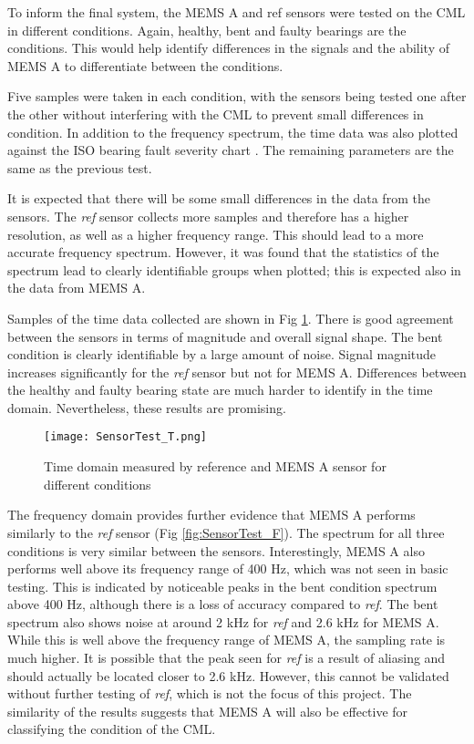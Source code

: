 To inform the final system, the MEMS A and ref sensors were tested on the CML in different conditions.
Again, healthy, bent and faulty bearings are the conditions.
This would help identify differences in the signals and the ability of MEMS A to differentiate between the conditions.
\par

Five samples were taken in each condition, with the sensors being tested one after the other without interfering with the CML to prevent small differences in condition.
In addition to the frequency spectrum, the time data was also plotted against the ISO bearing fault severity chart \cite{ISO13373-3}.
The remaining parameters are the same as the previous test.
\par

It is expected that there will be some small differences in the data from the sensors.
The \textit{ref} sensor collects more samples and therefore has a higher resolution, as well as a higher frequency range.
This should lead to a more accurate frequency spectrum.
However, it was found that the statistics of the spectrum lead to clearly identifiable groups when plotted; this is expected also in the data from MEMS A.
\par

Samples of the time data collected are shown in Fig \ref{fig:SensorTest_T}.
There is good agreement between the sensors in terms of magnitude and overall signal shape.
The bent condition is clearly identifiable by a large amount of noise.
Signal magnitude increases significantly for the \textit{ref} sensor but not for MEMS A.
Differences between the healthy and faulty bearing state are much harder to identify in the time domain.
Nevertheless, these results are promising.
\par

\begin{figure}
    \centering
    \texttt{[image: SensorTest\_T.png]}
    \caption{Time domain measured by reference and MEMS A sensor for different conditions}
    \label{fig:SensorTest_T}
\end{figure}

The frequency domain provides further evidence that MEMS A performs similarly to the \textit{ref} sensor (Fig \ref{fig:SensorTest_F}).
The spectrum for all three conditions is very similar between the sensors.
Interestingly, MEMS A also performs well above its frequency range of 400 Hz, which was not seen in basic testing.
This is indicated by noticeable peaks in the bent condition spectrum above 400 Hz, although there is a loss of accuracy compared to \textit{ref}.
The bent spectrum also shows noise at around 2 kHz for \textit{ref} and 2.6 kHz for MEMS A.
While this is well above the frequency range of MEMS A, the sampling rate is much higher.
It is possible that the peak seen for \textit{ref} is a result of aliasing and should actually be located closer to 2.6 kHz.
However, this cannot be validated without further testing of \textit{ref}, which is not the focus of this project.
The similarity of the results suggests that MEMS A will also be effective for classifying the condition of the CML.
\par

